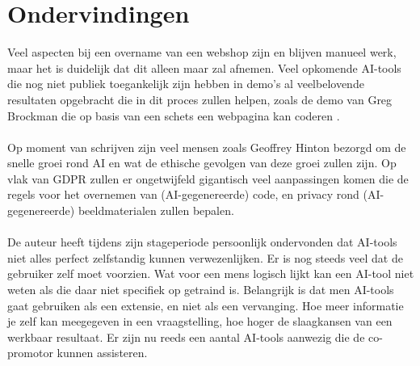 \section{Ondervindingen}
Veel aspecten bij een overname van een webshop zijn en blijven manueel werk, maar het is duidelijk dat dit alleen maar zal afnemen. Veel opkomende AI-tools die nog niet publiek toegankelijk zijn hebben in demo's al veelbelovende resultaten opgebracht die in dit proces zullen helpen, zoals de demo van Greg Brockman die op basis van een schets een webpagina kan coderen \autocite{Das2023}.
\\\\
Op moment van schrijven zijn veel mensen zoals Geoffrey Hinton \autocite{ZoeKleinman2023} bezorgd om de snelle groei rond AI en wat de ethische gevolgen van deze groei zullen zijn. Op vlak van GDPR zullen er ongetwijfeld gigantisch veel aanpassingen komen die de regels voor het overnemen van (AI-gegenereerde) code, en privacy rond (AI-gegenereerde) beeldmaterialen zullen bepalen.
\\\\
De auteur heeft tijdens zijn stageperiode persoonlijk ondervonden dat AI-tools niet alles perfect zelfstandig kunnen verwezenlijken. Er is nog steeds veel dat de gebruiker zelf moet voorzien. Wat voor een mens logisch lijkt kan een AI-tool niet weten als die daar niet specifiek op getraind is. Belangrijk is dat men AI-tools gaat gebruiken als een extensie, en niet als een vervanging. Hoe meer informatie je zelf kan meegegeven in een vraagstelling, hoe hoger de slaagkansen van een werkbaar resultaat. Er zijn nu reeds een aantal AI-tools aanwezig die de co-promotor kunnen assisteren. 
\\\\
